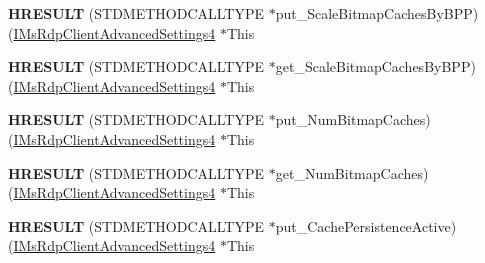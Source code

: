 \begin{DoxyCompactItemize}
\item 
\mbox{\label{struct_m_s_t_s_c_lib_1_1_i_ms_rdp_client_advanced_settings4_vtbl_ab2ed16bccabe00ad74f5921523c89175}} 
{\bfseries H\+R\+E\+S\+U\+LT} (S\+T\+D\+M\+E\+T\+H\+O\+D\+C\+A\+L\+L\+T\+Y\+PE $\ast$put\+\_\+\+Scale\+Bitmap\+Caches\+By\+B\+PP)(\hyperlink{interface_m_s_t_s_c_lib_1_1_i_ms_rdp_client_advanced_settings4}{I\+Ms\+Rdp\+Client\+Advanced\+Settings4} $\ast$This
\item 
\mbox{\label{struct_m_s_t_s_c_lib_1_1_i_ms_rdp_client_advanced_settings4_vtbl_a225d363a833d0850f75e884bd179a658}} 
{\bfseries H\+R\+E\+S\+U\+LT} (S\+T\+D\+M\+E\+T\+H\+O\+D\+C\+A\+L\+L\+T\+Y\+PE $\ast$get\+\_\+\+Scale\+Bitmap\+Caches\+By\+B\+PP)(\hyperlink{interface_m_s_t_s_c_lib_1_1_i_ms_rdp_client_advanced_settings4}{I\+Ms\+Rdp\+Client\+Advanced\+Settings4} $\ast$This
\item 
\mbox{\label{struct_m_s_t_s_c_lib_1_1_i_ms_rdp_client_advanced_settings4_vtbl_adafe0292481a87f92a30f4a2ee62954c}} 
{\bfseries H\+R\+E\+S\+U\+LT} (S\+T\+D\+M\+E\+T\+H\+O\+D\+C\+A\+L\+L\+T\+Y\+PE $\ast$put\+\_\+\+Num\+Bitmap\+Caches)(\hyperlink{interface_m_s_t_s_c_lib_1_1_i_ms_rdp_client_advanced_settings4}{I\+Ms\+Rdp\+Client\+Advanced\+Settings4} $\ast$This
\item 
\mbox{\label{struct_m_s_t_s_c_lib_1_1_i_ms_rdp_client_advanced_settings4_vtbl_a7586d7d179b2f10b399c3dd7f57b4b0e}} 
{\bfseries H\+R\+E\+S\+U\+LT} (S\+T\+D\+M\+E\+T\+H\+O\+D\+C\+A\+L\+L\+T\+Y\+PE $\ast$get\+\_\+\+Num\+Bitmap\+Caches)(\hyperlink{interface_m_s_t_s_c_lib_1_1_i_ms_rdp_client_advanced_settings4}{I\+Ms\+Rdp\+Client\+Advanced\+Settings4} $\ast$This
\item 
\mbox{\label{struct_m_s_t_s_c_lib_1_1_i_ms_rdp_client_advanced_settings4_vtbl_ab39a8f625c995382793409c9f28ee7de}} 
{\bfseries H\+R\+E\+S\+U\+LT} (S\+T\+D\+M\+E\+T\+H\+O\+D\+C\+A\+L\+L\+T\+Y\+PE $\ast$put\+\_\+\+Cache\+Persistence\+Active)(\hyperlink{interface_m_s_t_s_c_lib_1_1_i_ms_rdp_client_advanced_settings4}{I\+Ms\+Rdp\+Client\+Advanced\+Settings4} $\ast$This

\end{DoxyCompactItemize}
